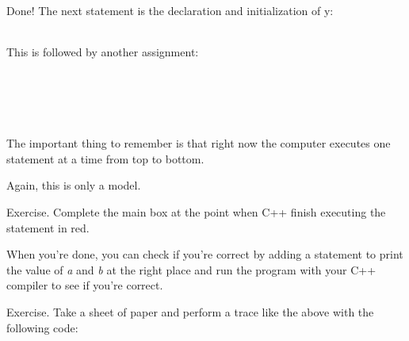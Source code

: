 \documentclass[
]{article}
\begin{document}
\begin{longtable}[]{@{}@{}}
\toprule
\endhead
\bottomrule
\end{longtable}

\begin{longtable}[]{@{}@{}}
\toprule
\endhead
\bottomrule
\end{longtable}

Done! The next statement is the declaration and initialization of y:

\begin{longtable}[]{@{}@{}}
\toprule
\endhead
\bottomrule
\end{longtable}

This is followed by another assignment:

\begin{longtable}[]{@{}@{}}
\toprule
\endhead
\bottomrule
\end{longtable}

\begin{longtable}[]{@{}@{}}
\toprule
\endhead
\bottomrule
\end{longtable}

\begin{longtable}[]{@{}@{}}
\toprule
\endhead
\bottomrule
\end{longtable}

\begin{longtable}[]{@{}@{}}
\toprule
\endhead
\bottomrule
\end{longtable}

\begin{longtable}[]{@{}@{}}
\toprule
\endhead
\bottomrule
\end{longtable}

The important thing to remember is that right now the computer executes
one statement at a time from top to bottom.

Again, this is only a model.

Exercise. Complete the main box at the point when C++ finish executing
the statement in red.

When you're done, you can check if you're correct by adding a statement
to print the value of \emph{a} and \emph{b} at the right place and run
the program with your C++ compiler to see if you're correct.

Exercise. Take a sheet of paper and perform a trace like the above with
the following code:

\begin{longtable}[]{@{}@{}}
\toprule
\endhead
\bottomrule
\end{longtable}
\end{document}

